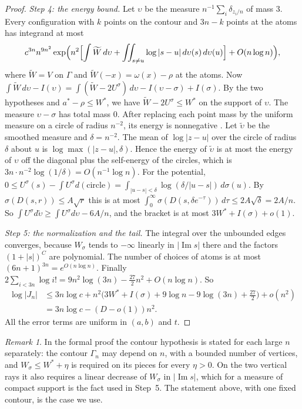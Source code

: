 \documentclass[11pt]{amsart}
\theoremstyle{definition}
\theoremstyle{remark}
\newtheorem{remark}[theorem]{Remark}
\numberwithin{equation}{section}
\begin{document}
\begin{proof}
\emph{Step 4: the energy bound.} Let $\upsilon$ be the measure $n^{-1}\sum_i\delta_{z_i/n}$ of mass $3$. Every
configuration with $k$ points on the contour and $3n-k$ points at the atoms has integrand at most
\[
 c^{3n}n^{9n^2}\exp\Bigl(n^2\Bigl[\int\widetilde W\,d\upsilon+\iint_{s\ne u}\log|s-u|\,d\upsilon(s)\,d\upsilon(u)\Bigr]+O(n\log n)\Bigr),
\]
where $\widetilde W=V$ on $\Gamma$ and $\widetilde W(-x)=\omega(x)-\rho$ at the atoms. Now
$\int\widetilde W\,d\upsilon-I(\upsilon)=\int(\widetilde W-2U^\sigma)\,d\upsilon-I(\upsilon-\sigma)+I(\sigma)$. By the two
hypotheses and $a^*-\rho\le W^*$, we have $\widetilde W-2U^\sigma\le W^*$ on the support of $\upsilon$. The measure
$\upsilon-\sigma$ has total mass $0$. After replacing each point mass by the uniform measure on a circle of radius
$n^{-2}$, its energy is nonnegative \cite[Lemma~I.1.8]{SaffTotik}. Let $\tilde\upsilon$ be the smoothed measure and
$\delta=n^{-2}$. The mean of $\log|z-u|$ over the circle of radius $\delta$ about $u$ is $\log\max(|z-u|,\delta)$.
Hence the energy of $\tilde\upsilon$ is at most the energy of $\upsilon$ off the diagonal plus the self-energy of the
circles, which is $3n\cdot n^{-2}\log(1/\delta)=O(n^{-1}\log n)$. For the potential,
$0\le U^\sigma(s)-\int U^\sigma d(\text{circle})=\int_{|u-s|<\delta}\log(\delta/|u-s|)\,d\sigma(u)$. By
$\sigma(D(s,r))\le A\sqrt r$ this is at most $\int_0^\infty\sigma(D(s,\delta e^{-\tau}))\,d\tau\le2A\sqrt\delta=2A/n$. So
$\int U^\sigma d\tilde\upsilon\ge\int U^\sigma d\upsilon-6A/n$, and the bracket is at most $3W^*+I(\sigma)+o(1)$.

\emph{Step 5: the normalization and the tail.} The integral over the unbounded edges converges, because $W_\sigma$
tends to $-\infty$ linearly in $|\operatorname{Im}s|$ there and the factors $(1+|s|)^C$ are polynomial. The number of
choices of atoms is at most $(6n+1)^{3n}=e^{O(n\log n)}$. Finally
$2\sum_{i<3n}\log i!=9n^2\log(3n)-\tfrac{27}2n^2+O(n\log n)$. So
\begin{align*}
 \log|J_n|&\le3n\log c+n^2\bigl(3W^*+I(\sigma)+9\log n-9\log(3n)+\tfrac{27}2\bigr)+o(n^2)\\
 &=3n\log c-(D-o(1))n^2.
\end{align*}
All the error terms are uniform in $(a,b)$ and $t$.
\end{proof}

\begin{remark}
In the formal proof the contour hypothesis is stated for each large $n$ separately: the contour $\Gamma_n$ may depend on
$n$, with a bounded number of vertices, and $W_\sigma\le W^*+\eta$ is required on its pieces for every $\eta>0$. On the
two vertical rays it also requires a linear decrease of $W_\sigma$ in $|\operatorname{Im}s|$, which for a measure of
compact support is the fact used in Step~5. The statement above, with one fixed contour, is the case we use.
\end{remark}
\end{document}

